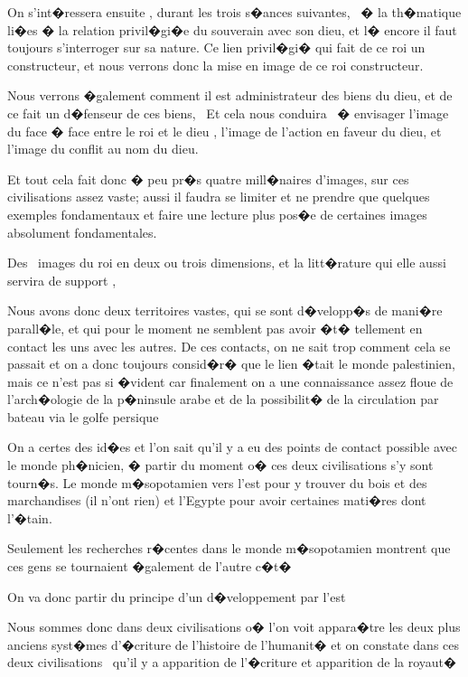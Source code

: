 \documentclass{article}
\begin{document}
\bigskip

On s'int�ressera ensuite , durant les trois s�ances suivantes, \ � la th�matique li�es � la relation privil�gi�e du souverain avec son dieu, et l� encore il faut toujours s'interroger sur sa nature. Ce lien privil�gi� qui fait de ce roi un constructeur, et nous verrons donc la mise en image de ce roi constructeur.

Nous verrons �galement comment il est administrateur des biens du dieu, et de ce fait un d�fenseur de ces biens, \ Et cela nous conduira \ � envisager l'image du face � face entre le roi et le dieu , l'image de l'action en faveur du dieu, et l'image du conflit au nom du dieu.


\bigskip

Et tout cela fait donc � peu pr�s quatre mill�naires d'images, sur ces civilisations assez vaste; aussi il faudra se limiter et ne prendre que quelques exemples fondamentaux et faire une lecture plus pos�e de certaines images absolument fondamentales. 

Des \ images du roi en deux ou trois dimensions, et la litt�rature qui elle aussi servira de support , 


\bigskip

Nous avons donc deux territoires vastes, qui se sont d�velopp�s de mani�re parall�le, et qui pour le moment ne semblent pas avoir �t� tellement en contact les uns avec les autres. De ces contacts, on ne sait trop comment cela se passait et on a donc toujours consid�r� que le lien �tait le monde palestinien, mais ce n'est pas si �vident car finalement on a une connaissance assez floue de l'arch�ologie de la p�ninsule arabe et de la possibilit� de la circulation par bateau via le golfe persique

On a certes des id�es et l'on sait qu'il y a eu des points de contact possible avec le monde ph�nicien, � partir du moment o� ces deux civilisations s'y sont tourn�s. Le monde m�sopotamien vers l'est pour y trouver du bois et des marchandises (il n'ont rien) et l'Egypte pour avoir certaines mati�res dont l'�tain.

Seulement les recherches r�centes dans le monde m�sopotamien montrent que ces gens se tournaient �galement de l'autre c�t�


\bigskip

On va donc partir du principe d'un d�veloppement par l'est

Nous sommes donc dans deux civilisations o� l'on voit appara�tre les deux plus anciens syst�mes d'�criture de l'histoire de l'humanit� et on constate dans ces deux civilisations \ qu'il y a apparition de l'�criture et apparition de la royaut�
\end{document}
